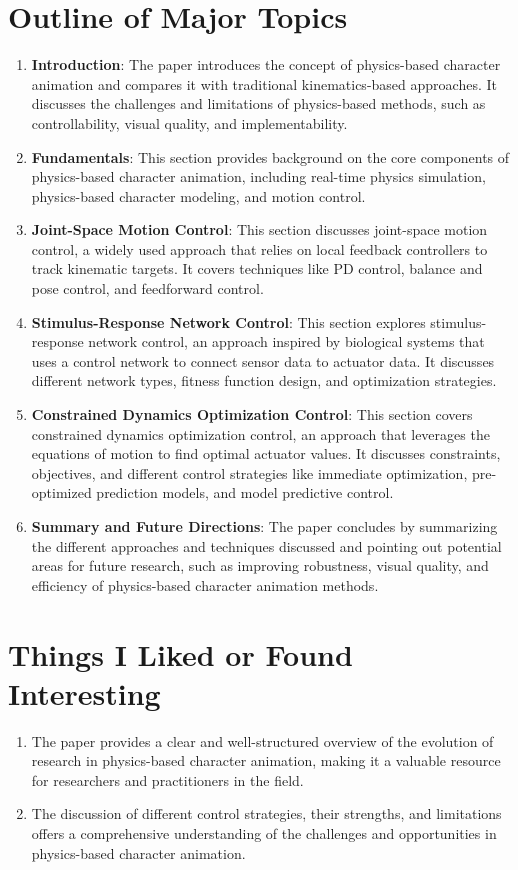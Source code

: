 \documentclass[12pt]{article}
\begin{document}
\section{Outline of Major Topics}
\begin{enumerate}[noitemsep]
    \item \textbf{Introduction}: The paper introduces the concept of physics-based character animation and compares it with traditional kinematics-based approaches. It discusses the challenges and limitations of physics-based methods, such as controllability, visual quality, and implementability.
    \item \textbf{Fundamentals}: This section provides background on the core components of physics-based character animation, including real-time physics simulation, physics-based character modeling, and motion control.
    \item \textbf{Joint-Space Motion Control}: This section discusses joint-space motion control, a widely used approach that relies on local feedback controllers to track kinematic targets. It covers techniques like PD control, balance and pose control, and feedforward control.
    \item \textbf{Stimulus-Response Network Control}: This section explores stimulus-response network control, an approach inspired by biological systems that uses a control network to connect sensor data to actuator data. It discusses different network types, fitness function design, and optimization strategies.
    \item \textbf{Constrained Dynamics Optimization Control}: This section covers constrained dynamics optimization control, an approach that leverages the equations of motion to find optimal actuator values. It discusses constraints, objectives, and different control strategies like immediate optimization, pre-optimized prediction models, and model predictive control.
    \item \textbf{Summary and Future Directions}: The paper concludes by summarizing the different approaches and techniques discussed and pointing out potential areas for future research, such as improving robustness, visual quality, and efficiency of physics-based character animation methods.
\end{enumerate}

\section{Things I Liked or Found Interesting}
\begin{enumerate}[noitemsep]
    \item The paper provides a clear and well-structured overview of the evolution of research in physics-based character animation, making it a valuable resource for researchers and practitioners in the field.
    \item The discussion of different control strategies, their strengths, and limitations offers a comprehensive understanding of the challenges and opportunities in physics-based character animation.
\end{enumerate}
\end{document}
